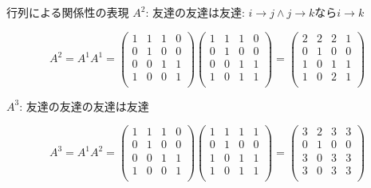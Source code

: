 \documentclass{beamer}
\begin{document}
\begin{frame}[fragile]{行列による関係性の表現}{}
$A^2$: 友達の友達は友達: $i\to j \wedge j \to k$なら$i \to k$

\[
A^{2} = A^{1}A^{1} = 
\begin{pmatrix}
1 & 1 & 1 & 0\\
0 & 1 & 0 & 0\\
0 & 0 & 1 & 1\\
1 & 0 & 0 & 1\\
\end{pmatrix}
\begin{pmatrix}
1 & 1 & 1 & 0\\
0 & 1 & 0 & 0\\
0 & 0 & 1 & 1\\
1 & 0 & 1 & 1\\
\end{pmatrix}
=
\begin{pmatrix}
2 & 2 & 2 & 1\\
0 & 1 & 0 & 0\\
1 & 0 & 1 & 1\\
1 & 0 & 2 & 1\\
\end{pmatrix}
\]

$A^3$: 友達の友達の友達は友達

\[
A^{3} = A^{1}A^{2} = 
\begin{pmatrix}
1 & 1 & 1 & 0\\
0 & 1 & 0 & 0\\
0 & 0 & 1 & 1\\
1 & 0 & 0 & 1\\
\end{pmatrix}
\begin{pmatrix}
1 & 1 & 1 & 1\\
0 & 1 & 0 & 0\\
1 & 0 & 1 & 1\\
1 & 0 & 1 & 1\\
\end{pmatrix}
=
\begin{pmatrix}
3 & 2 & 3 & 3\\
0 & 1 & 0 & 0\\
3 & 0 & 3 & 3\\
3 & 0 & 3 & 3\\
\end{pmatrix}
\]
\end{frame}
\end{document}
